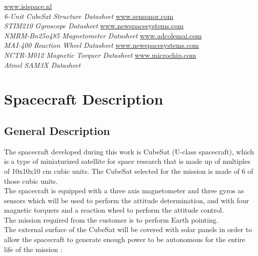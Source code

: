 \documentclass[11pt,a4paper]{report}
\begin{document}
\renewcommand\bibname{Datasheets \& User Manuals}
\renewcommand\UrlFont{\rmfamily}
\begin{thebibliography}{0}
\setcounter{enumiv}{6}
    \url{www.isispace.nl}\\
    \textit{6-Unit CubeSat Structure Datasheet} 
    \url{www.sensonor.com}\\
    \textit{STIM210 Gyroscope Datasheet} 
    \url{www.newspacesystems.com}\\
    \textit{NMRM-Bn25o485 Magnetometer Datasheet}
    \url{www.adcolemai.com}\\
    \textit{MAI-400 Reaction Wheel Datasheet}      
    \url{www.newspacesystems.com}\\
    \textit{NCTR-M012 Magnetic Torquer Datasheet}    
    \url{www.microchip.com}\\
    \textit{Atmel SAM3X Datasheet}       
\end{thebibliography}

\chapter{Spacecraft Description}

\section{General Description} \label{sec:general}
The spacecraft developed during this work is CubeSat (U-class spacecraft), which is a type of miniaturized satellite for space research that is made up of multiples of 10x10x10 cm cubic units. The CubeSat selected for the mission is made of 6 of those cubic units. \\
The spacecraft is equipped with a three axis magnetometer and three gyros as sensors which will be used to perform the attitude determination, and with four magnetic torquers and a reaction wheel to perform the attitude control.\\
The mission required from the customer is to perform Earth pointing.\\
The external surface of the CubeSat will be covered with solar panels in order to allow the spacecraft to generate enough power to be autonomous for the entire life of the mission : 
\end{document}
